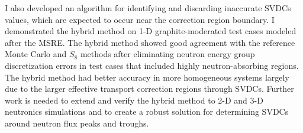 I also developed an algorithm for identifying and discarding inaccurate \glspl{SVDC} values, which
are expected to occur near the correction region boundary. I demonstrated the hybrid
method on 1-D graphite-moderated test cases modeled after the \gls{MSRE}. The hybrid method showed
good agreement with the reference Monte Carlo and $S_8$ methods after eliminating neutron energy
group discretization errors in test cases that included highly neutron-absorbing regions. The
hybrid method had better accuracy in more homogeneous systems largely due to the larger effective
transport correction regions through \glspl{SVDC}. Further work
is needed to extend and verify the hybrid method to 2-D and 3-D neutronics simulations and to
create a robust solution for determining \glspl{SVDC} around neutron flux peaks and troughs. 

